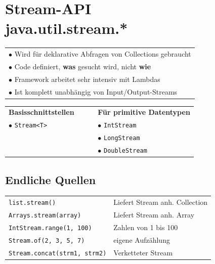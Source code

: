 {\small
\section{Stream-API $\qquad\qquad$ java.util.stream.*}
    \begin{tabular}{l}
        $\bullet$ Wird für deklarative Abfragen von Collections gebraucht\\
        $\bullet$ Code definiert, \textbf{was} gesucht wird, nicht \textbf{wie}\\
        $\bullet$ Framework arbeitet sehr intensiv mit Lambdas\\
        $\bullet$ Ist komplett unabhängig von Input/Output-Streams\\    
    \end{tabular}

    \begin{tabular}{l l}
        \rowcolor[RGB]{239,239,239} 
        \textbf{Basisschnittstellen} $\qquad$ & \textbf{Für primitive Datentypen}\\
        $\bullet$ \verb|Stream<T>| &$\bullet$ \verb|IntStream|\\
        & $\bullet$ \verb|LongStream|\\
        & $\bullet$ \verb|DoubleStream|\\
    \end{tabular}
    \vspace{-0.3cm}

\subsection{Endliche Quellen}
    \begin{tabular}{l l}
        \verb|list.stream()              | & Liefert Stream anh. Collection \\
        \verb|Arrays.stream(array)       | & Liefert Stream anh. Array \\
        \verb|IntStream.range(1, 100)    | & Zahlen von 1 bis 100 \\
        \verb|Stream.of(2, 3, 5, 7)      | & eigene Aufzählung \\
        \verb|Stream.concat(strm1, strm2)| & Verketteter Stream \\
    \end{tabular}
    \vspace{-0.3cm}

}

